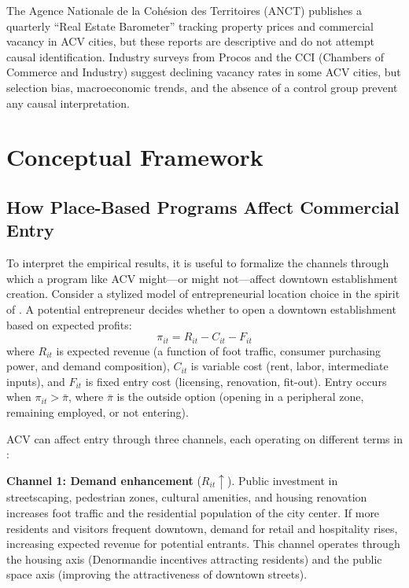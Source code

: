 \documentclass[12pt]{article}
\begin{document}
The Agence Nationale de la Coh\'esion des Territoires (ANCT) publishes a quarterly ``Real Estate Barometer'' tracking property prices and commercial vacancy in ACV cities, but these reports are descriptive and do not attempt causal identification. Industry surveys from Procos and the CCI (Chambers of Commerce and Industry) suggest declining vacancy rates in some ACV cities, but selection bias, macroeconomic trends, and the absence of a control group prevent any causal interpretation.

\section{Conceptual Framework}
\label{sec:framework}

\subsection{How Place-Based Programs Affect Commercial Entry}

To interpret the empirical results, it is useful to formalize the channels through which a program like ACV might---or might not---affect downtown establishment creation. Consider a stylized model of entrepreneurial location choice in the spirit of \citet{glaeser2005urban}. A potential entrepreneur decides whether to open a downtown establishment based on expected profits:
\begin{equation}
\pi_{it} = R_{it} - C_{it} - F_{it}
\label{eq:profit}
\end{equation}
where $R_{it}$ is expected revenue (a function of foot traffic, consumer purchasing power, and demand composition), $C_{it}$ is variable cost (rent, labor, intermediate inputs), and $F_{it}$ is fixed entry cost (licensing, renovation, fit-out). Entry occurs when $\pi_{it} > \bar{\pi}$, where $\bar{\pi}$ is the outside option (opening in a peripheral zone, remaining employed, or not entering).

ACV can affect entry through three channels, each operating on different terms in :

\textbf{Channel 1: Demand enhancement} ($R_{it} \uparrow$). Public investment in streetscaping, pedestrian zones, cultural amenities, and housing renovation increases foot traffic and the residential population of the city center. If more residents and visitors frequent downtown, demand for retail and hospitality rises, increasing expected revenue for potential entrants. This channel operates through the housing axis (Denormandie incentives attracting residents) and the public space axis (improving the attractiveness of downtown streets).
\end{document}
